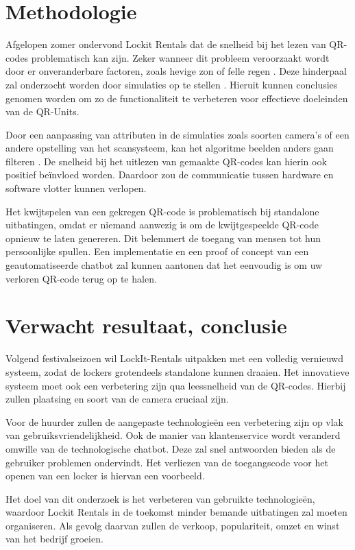 \documentclass{hogent-article}
\begin{document}
\section{Methodologie}%
\label{sec:methodologie}

Afgelopen zomer ondervond Lockit Rentals dat de snelheid bij het lezen van QR-codes problematisch kan zijn. Zeker wanneer dit probleem veroorzaakt wordt door er onveranderbare factoren, zoals hevige zon of felle regen \autocite{Girisha2022}.
Deze hinderpaal zal onderzocht worden door simulaties op te stellen \autocite{Skurowski2022}. Hieruit kunnen conclusies genomen worden om zo de functionaliteit te verbeteren voor effectieve doeleinden van de QR-Units. 

Door een aanpassing van attributen in de simulaties zoals soorten camera’s of een andere opstelling van het scansysteem, kan het algoritme beelden anders gaan filteren \autocite{Girisha2022}. De snelheid bij het uitlezen van gemaakte QR-codes kan hierin ook positief beïnvloed worden. Daardoor zou de communicatie tussen hardware en software vlotter kunnen verlopen.

Het kwijtspelen van een gekregen QR-code is problematisch bij standalone uitbatingen, omdat er niemand aanwezig is om de kwijtgespeelde QR-code opnieuw te laten genereren. Dit belemmert de toegang van mensen tot hun persoonlijke spullen. Een implementatie en een proof of concept van een geautomatiseerde chatbot zal kunnen aantonen dat het eenvoudig is om uw verloren QR-code terug op te halen.





\section{Verwacht resultaat, conclusie}%
\label{sec:verwachte_resultaten}

Volgend festivalseizoen wil LockIt-Rentals uitpakken met een volledig vernieuwd systeem, zodat de lockers grotendeels standalone kunnen draaien. Het innovatieve systeem moet ook een verbetering zijn qua leessnelheid van de QR-codes. Hierbij zullen plaatsing en soort van de camera cruciaal zijn. 

Voor de huurder zullen de aangepaste technologieën een verbetering zijn op vlak van gebruiksvriendelijkheid. Ook de manier van klantenservice wordt veranderd omwille van de technologische chatbot. Deze zal snel antwoorden bieden als de gebruiker problemen ondervindt. Het verliezen van de toegangscode voor het openen van een locker is hiervan een voorbeeld.

Het doel van dit onderzoek is het verbeteren van gebruikte technologieën, waardoor Lockit Rentals in de toekomst minder bemande uitbatingen zal moeten organiseren. Als gevolg daarvan zullen de verkoop, populariteit, omzet en winst van het bedrijf groeien.


\printbibliography[heading=bibintoc]
\end{document}
